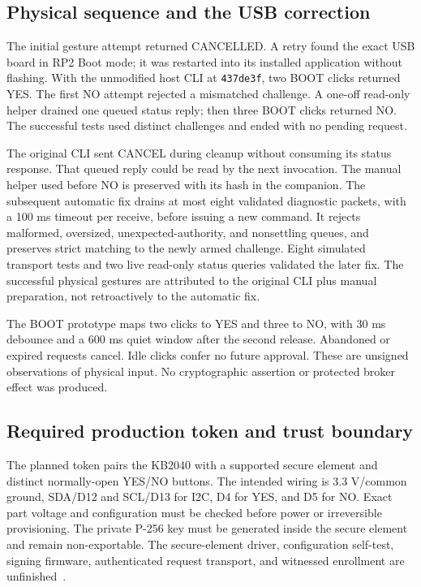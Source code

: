 \documentclass[journal]{IEEEtran}
\newcommand{\code}[1]{\texttt{#1}}
\begin{document}
\subsection{Physical sequence and the USB correction}
The initial gesture attempt returned CANCELLED. A retry found the exact USB board in RP2 Boot mode; it was restarted into its installed application without flashing. With the unmodified host CLI at \code{437de3f}, two BOOT clicks returned YES. The first NO attempt rejected a mismatched challenge. A one-off read-only helper drained one queued status reply; then three BOOT clicks returned NO. The successful tests used distinct challenges and ended with no pending request.

The original CLI sent CANCEL during cleanup without consuming its status response. That queued reply could be read by the next invocation. The manual helper used before NO is preserved with its hash in the companion. The subsequent automatic fix drains at most eight validated diagnostic packets, with a 100 ms timeout per receive, before issuing a new command. It rejects malformed, oversized, unexpected-authority, and nonsettling queues, and preserves strict matching to the newly armed challenge. Eight simulated transport tests and two live read-only status queries validated the later fix. The successful physical gestures are attributed to the original CLI plus manual preparation, not retroactively to the automatic fix.

The BOOT prototype maps two clicks to YES and three to NO, with 30 ms debounce and a 600 ms quiet window after the second release. Abandoned or expired requests cancel. Idle clicks confer no future approval. These are unsigned observations of physical input. No cryptographic assertion or protected broker effect was produced.

\subsection{Required production token and trust boundary}
The planned token pairs the KB2040 with a supported secure element and distinct normally-open YES/NO buttons. The intended wiring is 3.3 V/common ground, SDA/D12 and SCL/D13 for I2C, D4 for YES, and D5 for NO. Exact part voltage and configuration must be checked before power or irreversible provisioning. The private P-256 key must be generated inside the secure element and remain non-exportable. The secure-element driver, configuration self-test, signing firmware, authenticated request transport, and witnessed enrollment are unfinished~\cite{hardware}.
\end{document}
